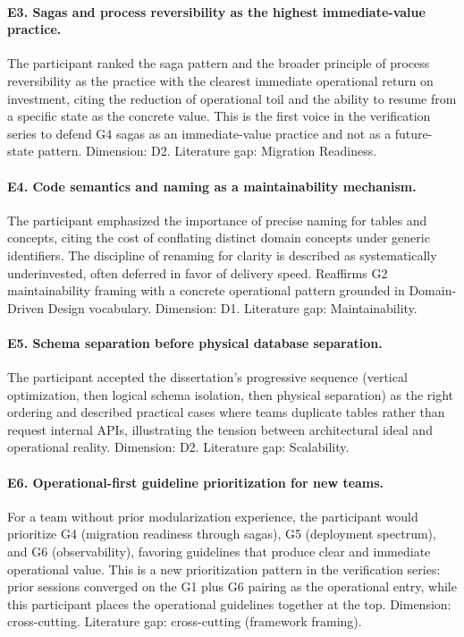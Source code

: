 \paragraph*{E3. Sagas and process reversibility as the highest immediate-value practice.} The participant ranked the saga pattern and the broader principle of process reversibility as the practice with the clearest immediate operational return on investment, citing the reduction of operational toil and the ability to resume from a specific state as the concrete value. This is the first voice in the verification series to defend G4 sagas as an immediate-value practice and not as a future-state pattern. Dimension: D2. Literature gap: Migration Readiness.

\paragraph*{E4. Code semantics and naming as a maintainability mechanism.} The participant emphasized the importance of precise naming for tables and concepts, citing the cost of conflating distinct domain concepts under generic identifiers. The discipline of renaming for clarity is described as systematically underinvested, often deferred in favor of delivery speed. Reaffirms G2 maintainability framing with a concrete operational pattern grounded in Domain-Driven Design vocabulary. Dimension: D1. Literature gap: Maintainability.

\paragraph*{E5. Schema separation before physical database separation.} The participant accepted the dissertation's progressive sequence (vertical optimization, then logical schema isolation, then physical separation) as the right ordering and described practical cases where teams duplicate tables rather than request internal APIs, illustrating the tension between architectural ideal and operational reality. Dimension: D2. Literature gap: Scalability.

\paragraph*{E6. Operational-first guideline prioritization for new teams.} For a team without prior modularization experience, the participant would prioritize G4 (migration readiness through sagas), G5 (deployment spectrum), and G6 (observability), favoring guidelines that produce clear and immediate operational value. This is a new prioritization pattern in the verification series: prior sessions converged on the G1 plus G6 pairing as the operational entry, while this participant places the operational guidelines together at the top. Dimension: cross-cutting. Literature gap: cross-cutting (framework framing).

